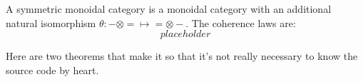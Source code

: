 \begin{defn}
A symmetric monoidal category is a monoidal category with an additional natural isomorphism $\theta: - \otimes = \mapsto = \otimes -$. The coherence laws are:
\[placeholder\]
\end{defn}

Here are two theorems that make it so that it's not really necessary to know the source code by heart.

\begin{theorem}[Strictification]

\end{theorem}

\begin{theorem}[Graphical?]

\end{theorem}





